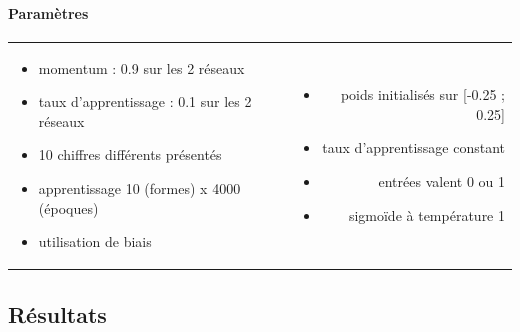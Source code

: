     \paragraph{Paramètres}
      \begin{center}
	\begin{tabular}{lr}
	  \begin{minipage}{230px}
	    \begin{itemize}
	      \item momentum : 0.9 sur les 2 réseaux
	      \item taux d'apprentissage : 0.1 sur les 2 réseaux
	      \item 10 chiffres différents présentés
	      \item apprentissage 10 (formes) x 4000 (époques)
	      \item utilisation de biais
	    \end{itemize}
	  \end{minipage}
	  &
	  \begin{minipage}{230px}
	    \begin{itemize}
	      \item poids initialisés sur [-0.25 ; 0.25]
	      \item taux d'apprentissage constant
	      \item entrées valent 0 ou 1
	      \item sigmoïde à température 1
	    \end{itemize}
	  \end{minipage}
	\end{tabular}
      \end{center}

  
  \newpage
  \subsection{Résultats}
